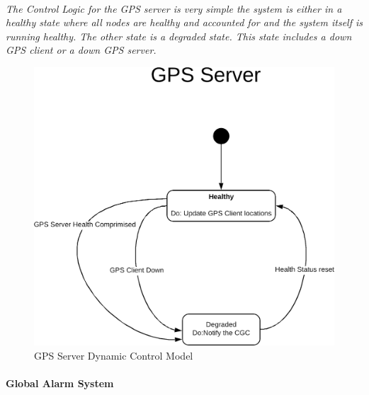 \documentclass[12pt]{article}
\begin{document}
    \paragraph{}\textit{The Control Logic for the GPS server is very simple the system is either in a healthy state where all nodes are healthy and accounted for and the system itself is running healthy. The other state is a degraded state. This state includes a down GPS client or a down GPS server.}
    \begin{figure}[H]
         \centerline{\includegraphics[scale=0.80]{GPSServer.png}}
         \caption{GPS Server Dynamic Control Model}
          \label{fig:gpsserver}
    \end{figure}

    \paragraph{Global Alarm System}
\end{document}
